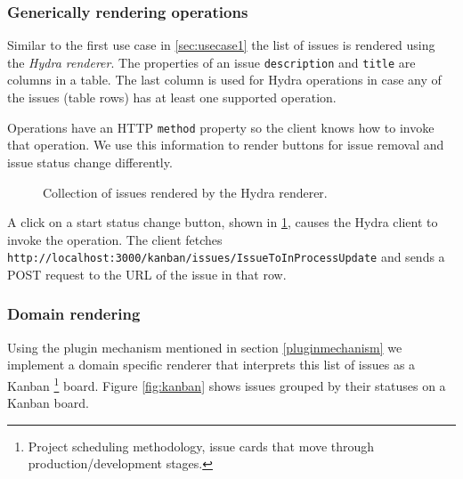 \subsubsection{Generically rendering operations}
Similar to the first use case in \ref{sec:usecase1} the list of issues is rendered using the \textit{Hydra renderer}. The properties of an issue \lstinline{description} and \lstinline{title} are columns in a table. The last column is used for Hydra operations in case any of the issues (table rows) has at least one supported operation.

Operations have an HTTP \lstinline{method} property so the client knows how to invoke that operation. We use this information to render buttons for issue removal and issue status change differently.

\begin{figure}[!htb]
  \caption{Collection of issues rendered by the Hydra renderer.}
  \label{fig:issueshydra}
\end{figure}

A click on a start status change button, shown in \ref{fig:issueshydra}, causes the Hydra client to invoke the operation. The client fetches \lstinline{http://localhost:3000/kanban/issues/IssueToInProcessUpdate} and sends a POST request to the URL of the issue in that row.

\subsubsection{Domain rendering}
Using the plugin mechanism mentioned in section \ref{pluginmechanism} we implement a domain specific renderer that interprets this list of issues as a Kanban \footnote{Project scheduling methodology, issue cards that move through production/development stages.} board. Figure \ref{fig:kanban} shows issues grouped by their statuses on a Kanban board.


